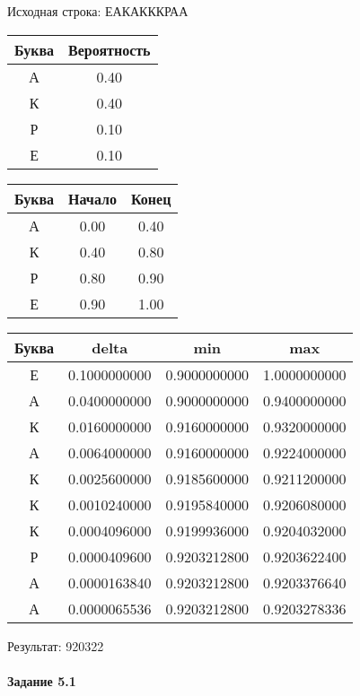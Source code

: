 \documentclass[a4paper, 12pt]{article}
\begin{document}
Исходная строка: ЕАКАКККРАА\
\begin{center}
 \begin{tabular}{ |c|c| } 
  \hline
     Буква & Вероятность \\ \hline
А & 0.40\\\hline
К & 0.40\\\hline
Р & 0.10\\\hline
Е & 0.10
\\ \hline \end{tabular}
\end{center}
\begin{center}
 \begin{tabular}{ |c|c|c| } 
  \hline
     Буква & Начало & Конец \\ \hline
А & 0.00 & 0.40\\\hline
К & 0.40 & 0.80\\\hline
Р & 0.80 & 0.90\\\hline
Е & 0.90 & 1.00
\\ \hline \end{tabular}
\end{center}
\begin{center}
 \begin{tabular}{ |c|c|c|c| } 
  \hline
     Буква & delta & min & max \\ \hline
Е & 0.1000000000 & 0.9000000000 & 1.0000000000\\\hline
А & 0.0400000000 & 0.9000000000 & 0.9400000000\\\hline
К & 0.0160000000 & 0.9160000000 & 0.9320000000\\\hline
А & 0.0064000000 & 0.9160000000 & 0.9224000000\\\hline
К & 0.0025600000 & 0.9185600000 & 0.9211200000\\\hline
К & 0.0010240000 & 0.9195840000 & 0.9206080000\\\hline
К & 0.0004096000 & 0.9199936000 & 0.9204032000\\\hline
Р & 0.0000409600 & 0.9203212800 & 0.9203622400\\\hline
А & 0.0000163840 & 0.9203212800 & 0.9203376640\\\hline
А & 0.0000065536 & 0.9203212800 & 0.9203278336
\\ \hline \end{tabular}
\end{center}
Результат: 920322
\pagebreak
\paragraph{Задание 5.1 \\
}
\end{document}
